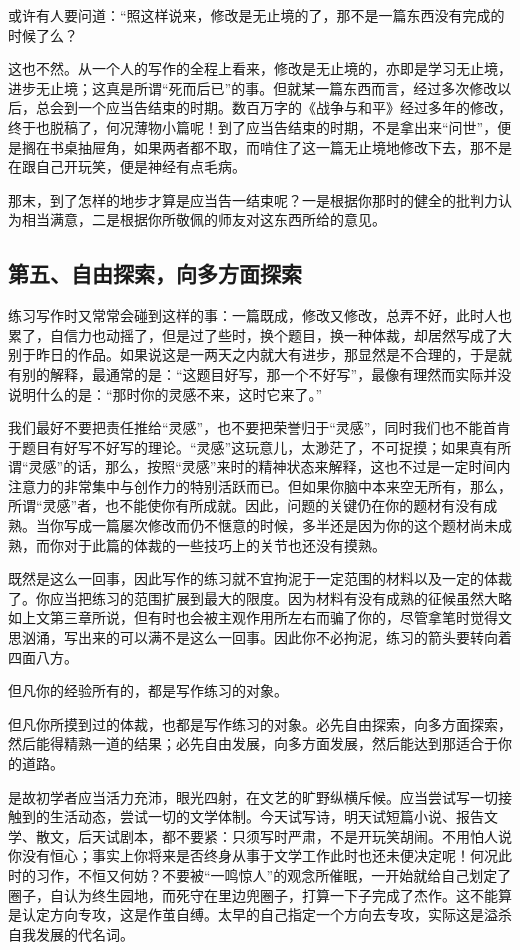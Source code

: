 \documentclass[fontset=fandol,12pt,a5paper]{ctexbook}
\begin{document}
或许有人要问道：“照这样说来，修改是无止境的了，那不是一篇东西没有完成的时候了么？

这也不然。从一个人的写作的全程上看来，修改是无止境的，亦即是学习无止境，进步无止境；这真是所谓“死而后已”的事。但就某一篇东西而言，经过多次修改以后，总会到一个应当告结束的时期。数百万字的《战争与和平》经过多年的修改，终于也脱稿了，何况薄物小篇呢！到了应当告结束的时期，不是拿出来“问世”，便是搁在书桌抽屉角，如果两者都不取，而啃住了这一篇无止境地修改下去，那不是在跟自己开玩笑，便是神经有点毛病。

那末，到了怎样的地步才算是应当告一结束呢？一是根据你那时的健全的批判力认为相当满意，二是根据你所敬佩的师友对这东西所给的意见。

\subsection{第五、自由探索，向多方面探索}
练习写作时又常常会碰到这样的事：一篇既成，修改又修改，总弄不好，此时人也累了，自信力也动摇了，但是过了些时，换个题目，换一种体裁，却居然写成了大别于昨日的作品。如果说这是一两天之内就大有进步，那显然是不合理的，于是就有别的解释，最通常的是：“这题目好写，那一个不好写”，最像有理然而实际并没说明什么的是：“那时你的灵感不来，这时它来了。”

我们最好不要把责任推给“灵感”，也不要把荣誉归于“灵感”，同时我们也不能首肯于题目有好写不好写的理论。“灵感”这玩意儿，太渺茫了，不可捉摸；如果真有所谓“灵感”的话，那么，按照“灵感”来时的精神状态来解释，这也不过是一定时间内注意力的非常集中与创作力的特别活跃而已。但如果你脑中本来空无所有，那么，所谓“灵感”者，也不能使你有所成就。因此，问题的关键仍在你的题材有没有成熟。当你写成一篇屡次修改而仍不惬意的时候，多半还是因为你的这个题材尚未成熟，而你对于此篇的体裁的一些技巧上的关节也还没有摸熟。

既然是这么一回事，因此写作的练习就不宜拘泥于一定范围的材料以及一定的体裁了。你应当把练习的范围扩展到最大的限度。因为材料有没有成熟的征候虽然大略如上文第三章所说，但有时也会被主观作用所左右而骗了你的，尽管拿笔时觉得文思汹涌，写出来的可以满不是这么一回事。因此你不必拘泥，练习的箭头要转向着四面八方。

但凡你的经验所有的，都是写作练习的对象。

但凡你所摸到过的体裁，也都是写作练习的对象。必先自由探索，向多方面探索，然后能得精熟一道的结果；必先自由发展，向多方面发展，然后能达到那适合于你的道路。

是故初学者应当活力充沛，眼光四射，在文艺的旷野纵横斥候。应当尝试写一切接触到的生活动态，尝试一切的文学体制。今天试写诗，明天试短篇小说、报告文学、散文，后天试剧本，都不要紧：只须写时严肃，不是开玩笑胡闹。不用怕人说你没有恒心；事实上你将来是否终身从事于文学工作此时也还未便决定呢！何况此时的习作，不恒又何妨？不要被“一鸣惊人”的观念所催眠，一开始就给自己划定了圈子，自认为终生园地，而死守在里边兜圈子，打算一下子完成了杰作。这不能算是认定方向专攻，这是作茧自缚。太早的自己指定一个方向去专攻，实际这是溢杀自我发展的代名词。
\end{document}
